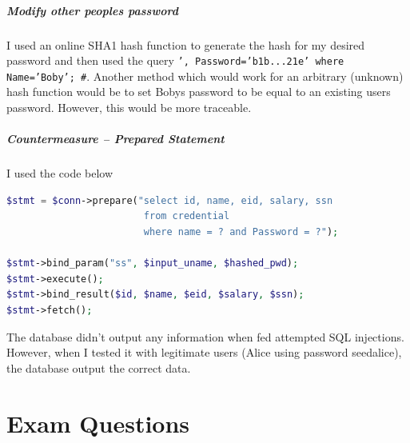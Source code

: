 \documentclass[10pt,\jkfside,a4paper]{article}
\begin{document}
\subsubsection{Modify other peoples password}

I used an online SHA1 hash function to generate the hash for my desired
password and then used the query \texttt{', Password='b1b...21e' where Name='Boby'; \#}.
Another method which would work for an arbitrary (unknown) hash function
would be to set Bobys password to be equal to an existing users password.
However, this would be more traceable.

\subsubsection{Countermeasure -- Prepared Statement}

I used the code below
\begin{lstlisting}[language=php, showstringspaces=false]
$stmt = $conn->prepare("select id, name, eid, salary, ssn
                        from credential
                        where name = ? and Password = ?");

$stmt->bind_param("ss", $input_uname, $hashed_pwd);
$stmt->execute();
$stmt->bind_result($id, $name, $eid, $salary, $ssn);
$stmt->fetch();
\end{lstlisting}

The database didn't output any information when fed attempted SQL injections.
However, when I tested it with legitimate users (Alice using password
seedalice), the database output the correct data.

\part{Exam Questions}
\end{document}
